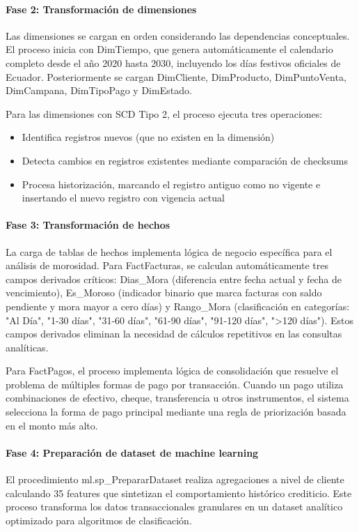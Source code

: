\paragraph{Fase 2: Transformación de dimensiones}
Las dimensiones se cargan en orden considerando las dependencias conceptuales. El proceso inicia con DimTiempo, que genera automáticamente el calendario completo desde el año 2020 hasta 2030, incluyendo los días festivos oficiales de Ecuador. Posteriormente se cargan DimCliente, DimProducto, DimPuntoVenta, DimCampana, DimTipoPago y DimEstado.

Para las dimensiones con SCD Tipo 2, el proceso ejecuta tres operaciones:
\begin{itemize}
    \item Identifica registros nuevos (que no existen en la dimensión)
    \item Detecta cambios en registros existentes mediante comparación de checksums
    \item Procesa historización, marcando el registro antiguo como no vigente e insertando el nuevo registro con vigencia actual
\end{itemize}

\paragraph{Fase 3: Transformación de hechos}
La carga de tablas de hechos implementa lógica de negocio específica para el análisis de morosidad. Para FactFacturas, se calculan automáticamente tres campos derivados críticos: Dias\_Mora (diferencia entre fecha actual y fecha de vencimiento), Es\_Moroso (indicador binario que marca facturas con saldo pendiente y mora mayor a cero días) y Rango\_Mora (clasificación en categorías: "Al Día", "1-30 días", "31-60 días", "61-90 días", "91-120 días", ">120 días"). Estos campos derivados eliminan la necesidad de cálculos repetitivos en las consultas analíticas.

Para FactPagos, el proceso implementa lógica de consolidación que resuelve el problema de múltiples formas de pago por transacción. Cuando un pago utiliza combinaciones de efectivo, cheque, transferencia u otros instrumentos, el sistema selecciona la forma de pago principal mediante una regla de priorización basada en el monto más alto.

\paragraph{Fase 4: Preparación de dataset de machine learning}
El procedimiento ml.sp\_PrepararDataset realiza agregaciones a nivel de cliente calculando 35 features que sintetizan el comportamiento histórico crediticio. Este proceso transforma los datos transaccionales granulares en un dataset analítico optimizado para algoritmos de clasificación.

